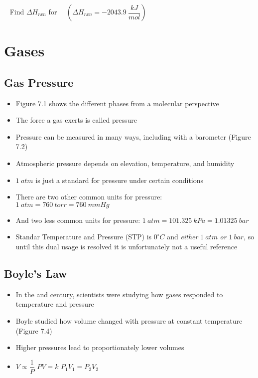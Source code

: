 \documentclass[12pt, openany, letterpaper]{memoir}
\begin{document}
\begin{itemize}
	      ~\hphantom{Practice:} Find $\Delta H_{rxn}$ for~~  \hspace{1em} $\left(\Delta H_{rxn}=-2043.9~\dfrac{kJ}{mol}\right)$
\end{itemize}

\chapter{Gases}
\section{Gas Pressure}
\begin{itemize}
	\item Figure 7.1 shows the different phases from a molecular perspective
	\item The force a gas exerts is called pressure
	\item Pressure can be measured in many ways, including with a barometer (Figure 7.2)
	\item Atmospheric pressure depends on elevation, temperature, and humidity
	\item $1~atm$ is just a standard for pressure under certain conditions
	\item There are two other common units for pressure: $1~atm=760~torr=760~mmHg$
	\item And two less common units for pressure: $1~atm=101.325~kPa=1.01325~bar$
  \item Standar Temperature and Pressure (STP) is $0^{\circ}C$ and \emph{either} $1~atm$ \emph{or} $1~bar$, so until this dual usage is resolved it is unfortunately not a useful reference
\end{itemize}
\section{Boyle's Law}
\begin{itemize}
	\item In the  and  century, scientists were studying how gases responded to temperature and pressure
	\item Boyle studied how volume changed with pressure at constant temperature (Figure 7.4)
	\item Higher pressures lead to proportionately lower volumes
	\item $V\propto \dfrac{1}{P}$ \hspace{2em} $PV=k$ \hspace{2em} $P_1V_1=P_2V_2$
\end{itemize}
\end{document}
